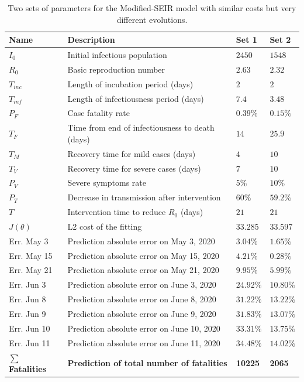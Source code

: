 \documentclass[11pt]{article}
\begin{document}
\begin{table}[H]
  \caption{Two sets of parameters for the Modified-SEIR model with similar costs but very different evolutions.}
  \label{table:comparison}
  \centering
  \begin{tabular}{llll}
    \toprule
    Name & Description & Set 1 & Set 2 \\
    \midrule
    $I_0$ & Initial infectious population & $2450$ & $1548$\\
    $R_0$ & Basic reproduction number & $2.63$ & $2.32$\\
    $T_{inc}$ & Length of incubation period (days) & $2$ & $2$\\
    $T_{inf}$ & Length of infectiousness period (days) & $7.4$ & $3.48$\\
    $P_F$ & Case fatality rate & $0.39\%$ & $0.15\%$\\
    $T_F$ & Time from end of infectiousness to death (days) & $14$ & $25.9$\\
    $T_M$ & Recovery time for mild cases (days) & $4$ & $10$\\
    $T_V$ & Recovery time for severe cases (days) & $7$ & $10$\\
    $P_V$ & Severe symptoms rate & $5\%$ & $10\%$\\
    $P_T$ & Decrease in transmission after intervention & $60\%$ & $59.2\%$\\
    $T$ & Intervention time to reduce $R_0$ (days) & $21$ & $21$\\
    \midrule
    $J(\theta)$ & L2 cost of the fitting & $33.285$ & $33.597$ \\
    Err. May 3 & Prediction absolute error on May 3, 2020 & $3.04\%$ & $1.65\%$\\
    Err. May 15 & Prediction absolute error on May 15, 2020 & $4.21\%$ & $0.28\%$\\
    Err. May 21 & Prediction absolute error on May 21, 2020 & $9.95\%$ & $5.99\%$\\
    Err. Jun 3 & Prediction absolute error on June 3, 2020 & $24.92\%$ & $10.80\%$\\
    Err. Jun 8 & Prediction absolute error on June 8, 2020 & $31.22\%$ & $13.22\%$\\
    Err. Jun 9 & Prediction absolute error on June 9, 2020 & $31.83\%$ & $13.07\%$\\
    Err. Jun 10 & Prediction absolute error on June 10, 2020 & $33.31\%$ & $13.75\%$\\
    Err. Jun 11 & Prediction absolute error on June 11, 2020 & $34.48\%$ & $14.02\%$\\
    \textbf{$\sum$ Fatalities} & \textbf{Prediction of total number of fatalities} & \textbf{10225} & \textbf{2065}\\
    \bottomrule
  \end{tabular}
\end{table}
\end{document}
